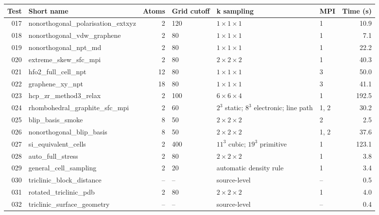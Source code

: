 \documentclass[aps,prb,preprint,superscriptaddress,longbibliography,floatfix]{revtex4-2}
\begin{document}
\begin{center}\scriptsize
\begin{tabular}{r p{40mm} r p{25mm} p{42mm} p{10mm} r}
\toprule Test & Short name & Atoms & Grid cutoff & k sampling & MPI & Time (s) \\
\midrule
017 & nonorthogonal\_\allowbreak{}polarisation\_\allowbreak{}extxyz & 2 & 120 & $1\times1\times1$ & 1 & 10.9 \\
018 & nonorthogonal\_\allowbreak{}vdw\_\allowbreak{}graphene & 2 & 80 & $1\times1\times1$ & 1 & 7.1 \\
019 & nonorthogonal\_\allowbreak{}npt\_\allowbreak{}md & 2 & 80 & $1\times1\times1$ & 1 & 22.2 \\
020 & extreme\_\allowbreak{}skew\_\allowbreak{}sfc\_\allowbreak{}mpi & 2 & 80 & $2\times2\times2$ & 1 & 40.3 \\
021 & hfo2\_\allowbreak{}full\_\allowbreak{}cell\_\allowbreak{}npt & 12 & 80 & $1\times1\times1$ & 3 & 50.0 \\
022 & graphene\_\allowbreak{}xy\_\allowbreak{}npt & 18 & 80 & $1\times1\times1$ & 3 & 41.1 \\
023 & hcp\_\allowbreak{}zr\_\allowbreak{}method3\_\allowbreak{}relax & 2 & 100 & $6\times6\times4$ & 1 & 192.5 \\
024 & rhombohedral\_\allowbreak{}graphite\_\allowbreak{}sfc\_\allowbreak{}mpi & 2 & 60 & $2^3$ static; $8^3$ electronic; line path & 1, 2 & 30.2 \\
025 & blip\_\allowbreak{}basis\_\allowbreak{}smoke & 8 & 50 & $2\times2\times2$ & 2 & 2.5 \\
026 & nonorthogonal\_\allowbreak{}blip\_\allowbreak{}basis & 8 & 50 & $2\times2\times2$ & 1, 2 & 37.6 \\
027 & si\_\allowbreak{}equivalent\_\allowbreak{}cells & 2 & 400 & $11^3$ cubic; $19^3$ primitive & 1 & 123.1 \\
028 & auto\_\allowbreak{}full\_\allowbreak{}stress & 2 & 80 & $2\times2\times2$ & 1 & 3.8 \\
029 & general\_\allowbreak{}cell\_\allowbreak{}sampling & 2 & 20 & automatic density rule & 1 & 3.4 \\
030 & triclinic\_\allowbreak{}block\_\allowbreak{}distance & -- & -- & source-level & -- & 0.5 \\
031 & rotated\_\allowbreak{}triclinic\_\allowbreak{}pdb & 2 & 80 & $2\times2\times2$ & 1 & 4.0 \\
032 & triclinic\_\allowbreak{}surface\_\allowbreak{}geometry & -- & -- & source-level & -- & 0.4 \\
\bottomrule
\end{tabular}
\end{center}
\end{document}
